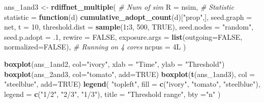 \documentclass[
]{book}
\newenvironment{Shaded}{\begin{snugshade}}{\end{snugshade}}
\newcommand{\AttributeTok}[1]{\textcolor[rgb]{0.13,0.29,0.53}{#1}}
\newcommand{\CommentTok}[1]{\textcolor[rgb]{0.56,0.35,0.01}{\textit{#1}}}
\newcommand{\ConstantTok}[1]{\textcolor[rgb]{0.56,0.35,0.01}{#1}}
\newcommand{\ControlFlowTok}[1]{\textcolor[rgb]{0.13,0.29,0.53}{\textbf{#1}}}
\newcommand{\DecValTok}[1]{\textcolor[rgb]{0.00,0.00,0.81}{#1}}
\newcommand{\FunctionTok}[1]{\textcolor[rgb]{0.13,0.29,0.53}{\textbf{#1}}}
\newcommand{\NormalTok}[1]{#1}
\newcommand{\OtherTok}[1]{\textcolor[rgb]{0.56,0.35,0.01}{#1}}
\newcommand{\SpecialCharTok}[1]{\textcolor[rgb]{0.81,0.36,0.00}{\textbf{#1}}}
\newcommand{\StringTok}[1]{\textcolor[rgb]{0.31,0.60,0.02}{#1}}
\begin{document}
\begin{Shaded}
\begin{Highlighting}[]
\NormalTok{ans\_1and3 }\OtherTok{\textless{}{-}} \FunctionTok{rdiffnet\_multiple}\NormalTok{(}
  \CommentTok{\# Num of sim}
  \AttributeTok{R              =}\NormalTok{ nsim,}
  \CommentTok{\# Statistic}
  \AttributeTok{statistic      =} \ControlFlowTok{function}\NormalTok{(d) }\FunctionTok{cumulative\_adopt\_count}\NormalTok{(d)[}\StringTok{"prop"}\NormalTok{,], }
  \AttributeTok{seed.graph     =}\NormalTok{ net,}
  \AttributeTok{t              =} \DecValTok{10}\NormalTok{,}
  \AttributeTok{threshold.dist =} \FunctionTok{sample}\NormalTok{(}\DecValTok{1}\SpecialCharTok{:}\DecValTok{3}\NormalTok{, }\DecValTok{500}\NormalTok{, }\ConstantTok{TRUE}\NormalTok{),}
  \AttributeTok{seed.nodes     =} \StringTok{"random"}\NormalTok{,}
  \AttributeTok{seed.p.adopt   =}\NormalTok{ .}\DecValTok{1}\NormalTok{,}
  \AttributeTok{rewire         =} \ConstantTok{FALSE}\NormalTok{,}
  \AttributeTok{exposure.args  =} \FunctionTok{list}\NormalTok{(}\AttributeTok{outgoing=}\ConstantTok{FALSE}\NormalTok{, }\AttributeTok{normalized=}\ConstantTok{FALSE}\NormalTok{),}
  \CommentTok{\# Running on 4 cores}
  \AttributeTok{ncpus          =}\NormalTok{ 4L}
\NormalTok{  )}
\end{Highlighting}
\end{Shaded}

\begin{Shaded}
\begin{Highlighting}[]
\FunctionTok{boxplot}\NormalTok{(ans\_1and2, }\AttributeTok{col=}\StringTok{"ivory"}\NormalTok{, }\AttributeTok{xlab =} \StringTok{"Time"}\NormalTok{, }\AttributeTok{ylab =} \StringTok{"Threshold"}\NormalTok{)}
\FunctionTok{boxplot}\NormalTok{(ans\_2and3, }\AttributeTok{col=}\StringTok{"tomato"}\NormalTok{, }\AttributeTok{add=}\ConstantTok{TRUE}\NormalTok{)}
\FunctionTok{boxplot}\NormalTok{(}\FunctionTok{t}\NormalTok{(ans\_1and3), }\AttributeTok{col =} \StringTok{"steelblue"}\NormalTok{, }\AttributeTok{add=}\ConstantTok{TRUE}\NormalTok{)}
\FunctionTok{legend}\NormalTok{(}
  \StringTok{"topleft"}\NormalTok{,}
  \AttributeTok{fill =} \FunctionTok{c}\NormalTok{(}\StringTok{"ivory"}\NormalTok{, }\StringTok{"tomato"}\NormalTok{, }\StringTok{"steelblue"}\NormalTok{),}
  \AttributeTok{legend =} \FunctionTok{c}\NormalTok{(}\StringTok{"1/2"}\NormalTok{, }\StringTok{"2/3"}\NormalTok{, }\StringTok{"1/3"}\NormalTok{),}
  \AttributeTok{title =} \StringTok{"Threshold range"}\NormalTok{,}
  \AttributeTok{bty =}\StringTok{"n"}
\NormalTok{)}
\end{Highlighting}
\end{Shaded}
\end{document}
